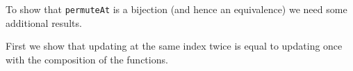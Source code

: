 To show that \texttt{permuteAt} is a bijection (and hence an equivalence) we need
some additional results.

First we show that updating at the same index twice is equal to updating once with the
composition of the functions.

\begin{code}%
\>[0]\AgdaSpace{}%
\AgdaSymbol{:}%
\>[277I]\AgdaSpace{}%
\AgdaSymbol{\{}\AgdaSymbol{\}}\AgdaSpace{}%
\AgdaSymbol{\{}\AgdaSpace{}%
\AgdaSymbol{:}\AgdaSpace{}%
\AgdaSymbol{\}}\AgdaSpace{}%
\AgdaSymbol{(}\AgdaSpace{}%
\AgdaSymbol{:}\AgdaSpace{}%
\AgdaSpace{}%
\AgdaSpace{}%
\AgdaSymbol{)}\AgdaSpace{}%
\AgdaSymbol{(}\AgdaSpace{}%
\AgdaSymbol{:}\AgdaSpace{}%
\AgdaSpace{}%
\AgdaSpace{}%
\AgdaSymbol{)}\AgdaSpace{}%
\AgdaSymbol{(}\AgdaSpace{}%
\AgdaSymbol{:}\AgdaSpace{}%
\AgdaSpace{}%
\AgdaSymbol{)}\<%
\\
\>[.][@{}l@{}]\<[277I]%
\>[12]\AgdaSpace{}%
\AgdaSymbol{(}\AgdaSpace{}%
\AgdaOperator{\AgdaFunction{[}}\AgdaSpace{}%
\AgdaSpace{}%
\AgdaOperator{\AgdaFunction{]\%=}}\AgdaSpace{}%
\AgdaSpace{}%
\AgdaOperator{\AgdaFunction{[}}\AgdaSpace{}%
\AgdaSpace{}%
\AgdaOperator{\AgdaFunction{]\%=}}\AgdaSpace{}%
\AgdaSymbol{)}\AgdaSpace{}%
\AgdaSpace{}%
\AgdaSymbol{(}\AgdaSpace{}%
\AgdaOperator{\AgdaFunction{[}}\AgdaSpace{}%
\AgdaSpace{}%
\AgdaOperator{\AgdaFunction{]\%=}}\AgdaSpace{}%
\AgdaSpace{}%
\AgdaSpace{}%
\AgdaSymbol{)}\<%
\end{code}
\begin{code}[hide]%
\>[0]\AgdaSpace{}%
\AgdaSpace{}%
\AgdaSymbol{(}\AgdaSpace{}%
\AgdaSpace{}%
\AgdaSymbol{)}\AgdaSpace{}%
\AgdaSpace{}%
\AgdaSymbol{=}\AgdaSpace{}%
\<%
\\
\>[0]\AgdaSpace{}%
\AgdaSpace{}%
\AgdaSymbol{(}\AgdaSpace{}%
\AgdaSpace{}%
\AgdaSymbol{)}\AgdaSpace{}%
\AgdaSymbol{(}\AgdaSpace{}%
\AgdaSymbol{)}\AgdaSpace{}%
\AgdaSymbol{=}\AgdaSpace{}%
\AgdaSpace{}%
\AgdaSymbol{(}\AgdaSpace{}%
\AgdaSymbol{)}\AgdaSpace{}%
\AgdaSymbol{(}\AgdaSpace{}%
\AgdaSpace{}%
\AgdaSpace{}%
\AgdaSymbol{)}\<%
\end{code}
